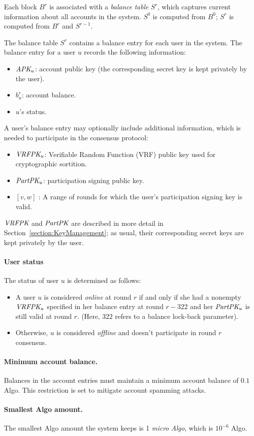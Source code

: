 \documentclass[../main.tex]{subfiles}
\begin{document}
Each block $B^r$ is associated with a \emph{balance table} $S^r$, which captures current information about all accounts in the system. 
$S^0$ is computed from $B^0$;
$S^r$ is computed from $B^r$ and $S^{r-1}$. 

The balance table $S^r$ contains a balance entry for each user in the system.
The balance entry for a user $u$ records the following information:
\begin{itemize}
\item $\textit{APK}_u$: account public key (the corresponding secret key is kept privately by the user). 
\item $b_u^r$: account balance.
\item $u$'s status.
\end{itemize}
A user's balance entry may optionally include additional information, which is needed to participate in the consensus protocol:
\begin{itemize}
\item $\textit{VRFPK}_u$: Verifiable Random Function (VRF) public key used for cryptographic sortition.
\item $\textit{PartPK}_u$: participation signing public key. 
\item $[v,w]$ : A range of rounds for which the user's participation signing key is valid. 
\end{itemize}
$\textit{VRFPK}$ and $\textit{PartPK}$ are described in more detail in Section~\ref{section:KeyManagement}; 
as usual, their corresponding secret keys are kept privately by the user.

\paragraph{User status}

The status of user $u$ is determined as follows:
\begin{itemize}
\item A user $u$ is considered \emph{online} at round $r$ if and only if she had a nonempty $\textit{VRFPK}_u$ specified in her balance entry at round $r-322$ and her $\textit{PartPK}_u$ is still valid at round $r$. 
(Here, $322$ refers to a balance lock-back parameter).
\item Otherwise, $u$ is considered \emph{offline} and doesn't participate in round $r$ consensus.
\end{itemize} 

\paragraph{Minimum account balance.}
Balances in the account entries must maintain a minimum account balance of $0.1$ Algo. This restriction is set to mitigate account spamming attacks.

\paragraph{Smallest Algo amount.}
The smallest Algo amount the system keeps is 1 {\em micro Algo}, which is $10^{-6}$ Algo.
\end{document}
